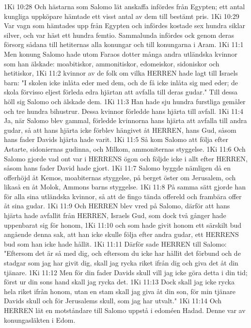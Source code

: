 1Ki 10:28  Och hästarna som Salomo lät anskaffa infördes från Egypten; ett antal kungliga uppköpare hämtade ett visst antal av dem till bestämt pris.
1Ki 10:29  Var vagn som hämtades upp från Egypten och infördes kostade sex hundra siklar silver, och var häst ett hundra femtio. Sammalunda infördes ock genom deras försorg sådana till hetiternas alla konungar och till konungarna i Aram.
1Ki 11:1  Men konung Salomo hade utom Faraos dotter många andra utländska kvinnor som han älskade: moabitiskor, ammonitiskor, edomeiskor, sidoniskor och hetitiskor,
1Ki 11:2  kvinnor av de folk om vilka HERREN hade lagt till Israels barn: "I skolen icke inlåta eder med dem, och de få icke inlåta sig med eder; de skola förvisso eljest förleda edra hjärtan att avfalla till deras gudar." Till dessa höll sig Salomo och älskade dem.
1Ki 11:3  Han hade sju hundra furstliga gemåler och tre hundra bihustrur. Dessa kvinnor förledde hans hjärta till avfall.
1Ki 11:4  Ja, när Salomo blev gammal, förledde kvinnorna hans hjärta att avfalla till andra gudar, så att hans hjärta icke förblev hängivet åt HERREN, hans Gud, såsom hans fader Davids hjärta hade varit.
1Ki 11:5  Så kom Salomo att följa efter Astarte, sidoniernas gudinna, och Milkom, ammoniternas styggelse.
1Ki 11:6  Och Salomo gjorde vad ont var i HERRENS ögon och följde icke i allt efter HERREN, såsom hans fader David hade gjort.
1Ki 11:7  Salomo byggde nämligen då en offerhöjd åt Kemos, moabiternas styggelse, på berget öster om Jerusalem, och likaså en åt Molok, Ammons barns styggelse.
1Ki 11:8  På samma sätt gjorde han för alla sina utländska kvinnor, så att de fingo tända offereld och frambära offer åt sina gudar.
1Ki 11:9  Och HERREN blev vred på Salomo, därför att hans hjärta hade avfallit från HERREN, Israels Gud, som dock två gånger hade uppenbarat sig för honom,
1Ki 11:10  och som hade givit honom ett särskilt bud angående denna sak, att han icke skulle följa efter andra gudar, ett HERRENS bud som han icke hade hållit.
1Ki 11:11  Därför sade HERREN till Salomo: "Eftersom det är så med dig, och eftersom du icke har hållit det förbund och de stadgar som jag har givit dig, skall jag rycka riket ifrån dig och giva det åt din tjänare.
1Ki 11:12  Men för din fader Davids skull vill jag icke göra detta i din tid; först ur din sons hand skall jag rycka det.
1Ki 11:13  Dock skall jag icke rycka hela riket ifrån honom, utan en stam skall jag giva åt din son, för min tjänare Davids skull och för Jerusalems skull, som jag har utvalt."
1Ki 11:14  Och HERREN lät en motståndare till Salomo uppstå i edoméen Hadad. Denne var av konungasläkten i Edom.
